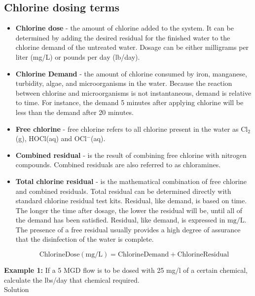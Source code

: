 \documentclass{article}
\begin{document}
\subsection*{Chlorine dosing terms}
\begin{itemize}
\item \textbf{Chlorine dose} - the amount of chlorine added to the system. It can be determined by adding the desired residual for the finished water to the chlorine demand of the untreated water. Dosage can be either milligrams per liter (mg/L) or pounds per day (lb/day).

\item \textbf{Chlorine Demand} - the amount of chlorine consumed by iron, manganese, turbidity, algae, and microorganisms in the water. Because the reaction between chlorine and microorganisms is not instantaneous, demand is relative to time. For instance, the demand 5 minutes after applying chlorine will be less than the demand after 20 minutes. 

\item \textbf{Free chlorine} - free chlorine refers to all chlorine present in the water as Cl$_2$(g), HOCl(aq) and OCl$^-$(aq).

\item \textbf{Combined residual} - is the result of combining free chlorine with nitrogen compounds. Combined residuals are also referred to as chloramines. 

\item \textbf{Total chlorine residual} - is the mathematical combination of free chlorine and combined residuals. Total residual can be determined directly with standard chlorine residual test kits.  Residual, like demand, is based on time. The longer the time after dosage, the lower the residual will be, until all of the demand has been satisfied. Residual, like demand, is expressed in $\mathrm{mg} / \mathrm{L}$. The presence of a free residual usually provides a high degree of assurance that the disinfection of the water is complete. 

$$\mathrm{Chlorine Dose} (\mathrm{mg} / \mathrm{L})= \mathrm{Chlorine Demand}+ \mathrm{ Chlorine Residual}$$
\end{itemize}
\textbf{Example 1:} If a 5 MGD flow is to be dosed with 25 mg/l of a certain chemical, calculate the lbs/day that chemical required.\\

Solution\\
\end{document}
